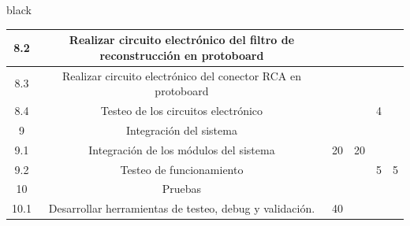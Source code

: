 \documentclass[11pt]{charter}
\begin{document}
\begin{consigna}{black}
\begin{table}[]
\begin{tabular}{|c|c|c|c|c|c|}
8.2                                                                                            & Realizar circuito electrónico del filtro de reconstrucción en protoboard           &    &              &              &                                                                     \\ \hline
8.3                                                                                            & Realizar circuito electrónico del conector RCA en protoboard                       &    &              &              &                                                                     \\ \hline
8.4                                                                                            & Testeo de los circuitos electrónico                                                &    &              & 4            &                                                                     \\ \hline
\rowcolor[HTML]{CBCEFB} 
9                                                                                              & Integración del sistema                                                            &    &              &              &                                                                     \\ \hline
9.1                                                                                            & Integración de los módulos del sistema                                             & 20 & 20           &              &                                                                     \\ \hline
9.2                                                                                            & Testeo de funcionamiento                                                           &    &              & 5            & 5                                                                   \\ \hline
\rowcolor[HTML]{CBCEFB} 
10                                                                                             & Pruebas                                                                            &    &              &              &                                                                     \\ \hline
10.1                                                                                           & Desarrollar herramientas de testeo, debug y validación.                            & 40 &              &              &                                                                     \\ \hline

\end{tabular}
\end{table}
\end{consigna}
\end{document}
